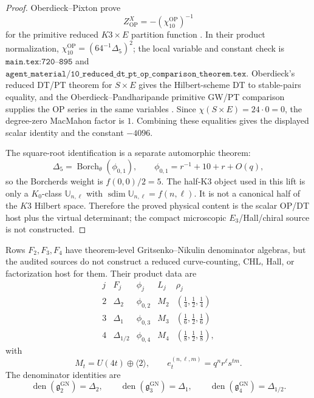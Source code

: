 \begin{proof}
Oberdieck--Pixton prove
\[
Z^X_{\mathrm{OP}}=-\left(\chi_{10}^{\mathrm{OP}}\right)^{-1}
\]
for the primitive reduced \(K3\times E\) partition function
\cite[Theorem 1]{OB}.  In their product normalization,
\(\chi_{10}^{\mathrm{OP}}=(64^{-1}\Delta_5)^2\); the local variable
and constant check is \(\texttt{main.tex:720--895}\) and
\(\texttt{agent\_material/10\_reduced\_dt\_pt\_op\_comparison\_theorem.tex}\).
Oberdieck's reduced DT/PT theorem for \(S\times E\) gives the
Hilbert-scheme DT to stable-pairs equality, and the
Oberdieck--Pandharipande primitive GW/PT comparison supplies the OP
series in the same variables \cite{OberdieckReducedPT,OPand}.  Since
\(\chi(S\times E)=24\cdot0=0\), the degree-zero MacMahon factor is
\(1\).  Combining these equalities gives the displayed scalar identity
and the constant \(-4096\).

The square-root identification is a separate automorphic theorem:
\[
\Delta_5=\operatorname{Borch}_{\theta}(\phi_{0,1}),\qquad
\phi_{0,1}=r^{-1}+10+r+O(q),
\]
so the Borcherds weight is \(f(0,0)/2=5\).  The half-K3 object used in
this lift is only a \(K_0\)-class
\(\mathbb U_{n,\ell}\) with
\(\operatorname{sdim}\mathbb U_{n,\ell}=f(n,\ell)\).  It is not a
canonical half of the \(K3\) Hilbert space.  Therefore the proved
physical content is the scalar OP/DT host plus the virtual determinant;
the compact microscopic \(E_3\)/Hall/chiral source is not constructed.
\end{proof}

\begin{proposition}
\label{prop:f2-f4-denominator-not-host}
Rows \(F_2,F_3,F_4\) have theorem-level Gritsenko--Nikulin denominator
algebras, but the audited sources do not construct a reduced
curve-counting, CHL, Hall, or factorization host for them.
Their product data are
\[
\begin{array}{c|c|c|c|c}
j&F_j&\phi_j&L_j&\rho_j\\ \hline
2&\Delta_2&\phi_{0,2}&M_2&(\frac14,\frac12,\frac14)\\
3&\Delta_1&\phi_{0,3}&M_3&(\frac16,\frac12,\frac16)\\
4&\Delta_{1/2}&\phi_{0,4}&M_4&(\frac18,\frac12,\frac18),
\end{array}
\]
with
\[
M_t=U(4t)\oplus\langle2\rangle,\qquad
e_t^{(n,\ell,m)}=q^nr^\ell s^{tm}.
\]
The denominator identities are
\[
\operatorname{den}(\mathfrak g^{\mathrm{GN}}_2)=\Delta_2,\qquad
\operatorname{den}(\mathfrak g^{\mathrm{GN}}_3)=\Delta_1,\qquad
\operatorname{den}(\mathfrak g^{\mathrm{GN}}_4)=\Delta_{1/2}.
\]
\end{proposition}

